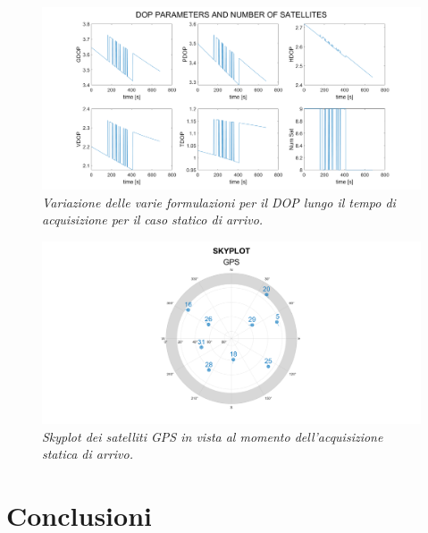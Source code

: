 \documentclass[a4paper,11pt,twoside]{book}
\begin{document}
	\begin{figure}[H]
		\centering
		\includegraphics[scale=0.25]{"Immagini workbook/Immagini esp3/stat23"}
		\caption{\textit{Variazione delle varie formulazioni per il DOP lungo il tempo di acquisizione per il caso statico di arrivo.}}
		\label{fig:stat23}
	\end{figure}
	
	\vspace{-0.5cm}
	
	
	\begin{figure}[H]
		\centering
		\includegraphics[scale=0.25]{"Immagini workbook/Immagini esp3/stat25"}
		\caption{\textit{Skyplot dei satelliti GPS in vista al momento dell'acquisizione statica di arrivo.}}
		\label{fig:stat25}
	\end{figure}

	\section{Conclusioni}
	
\end{document}
